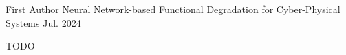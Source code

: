 

\begin{cventries}

  \cventry
    {First Author} %
    {Neural Network-based Functional Degradation for Cyber-Physical Systems} %
    {} %
    {Jul. 2024} %
    {
      \begin{cvitems} %
        \item {TODO}
      \end{cvitems}
    }

\end{cventries}
